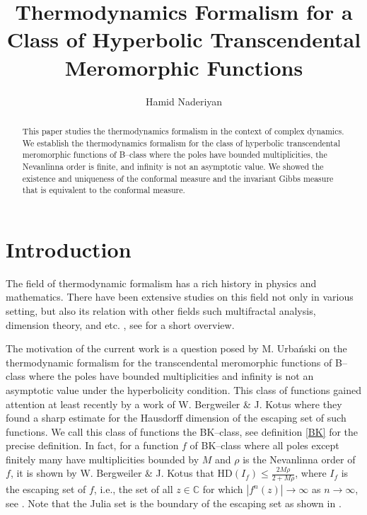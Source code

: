 \documentclass[12pt,reqno]{amsart}
\title{Thermodynamics Formalism for a Class of Hyperbolic Transcendental Meromorphic Functions}
\author{Hamid Naderiyan}
\newenvironment{nouppercase}{%
  \let\uppercase\relax%
  \renewcommand{\uppercasenonmath}[1]{}}{}
\begin{document}
\begin{abstract}
    This paper studies the thermodynamics formalism in the context of complex dynamics. We establish the thermodynamics formalism for the class of hyperbolic transcendental meromorphic functions of B--class  where the poles have bounded multiplicities, the Nevanlinna order is finite, and infinity is not an asymptotic value. We showed the existence and uniqueness of the conformal measure and the invariant Gibbs measure that is equivalent to the conformal measure.
    
\end{abstract}

\begin{nouppercase}
\maketitle
\end{nouppercase}


\tableofcontents

\section{Introduction}

\noindent The field of thermodynamic formalism has a rich history in physics and mathematics. There have been extensive studies on this field not only in various setting, but also its relation with other fields such multifractal analysis, dimension theory, and etc. , see \citep[section 1.1]{Barr} for a short overview.

\noindent The motivation of the current work is a question posed by M. Urba\'{n}ski on the thermodynamic formalism for the transcendental meromorphic functions of B--class where the poles have bounded multiplicities and infinity is not an asymptotic value under the hyperbolicity condition. This class of functions gained attention at least recently by a work of W. Bergweiler \& J. Kotus \cite{Bergweiler-Kotus} where they found a sharp estimate for the Hausdorff dimension of the escaping set of such functions. We call this class of functions the BK--class, see definition \ref{BK} for the precise definition. In fact, for a function $f$ of BK--class where all poles except finitely many have multiplicities bounded by $M$ and $\rho$ is the Nevanlinna order of $f$, it is shown by W. Bergweiler \& J. Kotus that $\text{HD}(I_f)\leq \frac{2M\rho }{2+M\rho}$, where $I_f$ is the escaping set of $f$, i.e., the set of all $z\in \mathbb{C}$ for which $|f^n(z)| \to \infty$ as $n\to \infty$, see \cite{Bergweiler-Kotus}. Note that the Julia set is the boundary of the escaping set as shown in \cite{Dominq}. 
\end{document}
